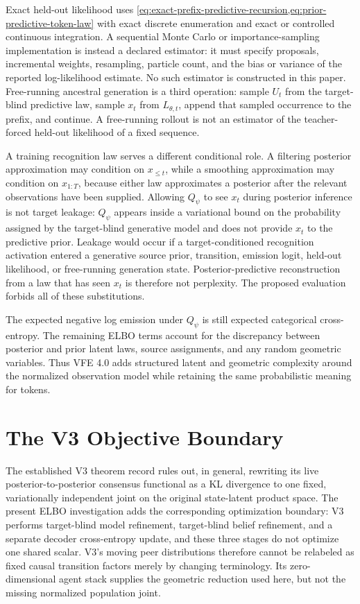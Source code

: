 Exact held-out likelihood uses \cref{eq:exact-prefix-predictive-recursion,eq:prior-predictive-token-law} with exact discrete enumeration and exact or controlled continuous integration. A sequential Monte Carlo or importance-sampling implementation is instead a declared estimator: it must specify proposals, incremental weights, resampling, particle count, and the bias or variance of the reported log-likelihood estimate. No such estimator is constructed in this paper. Free-running ancestral generation is a third operation: sample $U_t$ from the target-blind predictive law, sample $x_t$ from $L_{\theta,t}$, append that sampled occurrence to the prefix, and continue. A free-running rollout is not an estimator of the teacher-forced held-out likelihood of a fixed sequence.

A training recognition law serves a different conditional role. A filtering posterior approximation may condition on $x_{\leq t}$, while a smoothing approximation may condition on $x_{1:T}$, because either law approximates a posterior after the relevant observations have been supplied. Allowing $Q_\psi$ to see $x_t$ during posterior inference is not target leakage: $Q_\psi$ appears inside a variational bound on the probability assigned by the target-blind generative model and does not provide $x_t$ to the predictive prior. Leakage would occur if a target-conditioned recognition activation entered a generative source prior, transition, emission logit, held-out likelihood, or free-running generation state. Posterior-predictive reconstruction from a law that has seen $x_t$ is therefore not perplexity. The proposed evaluation forbids all of these substitutions.

The expected negative log emission under $Q_\psi$ is still expected categorical cross-entropy. The remaining ELBO terms account for the discrepancy between posterior and prior latent laws, source assignments, and any random geometric variables. Thus VFE 4.0 adds structured latent and geometric complexity around the normalized observation model while retaining the same probabilistic meaning for tokens.

\section{The V3 Objective Boundary}

The established V3 theorem record rules out, in general, rewriting its live posterior-to-posterior consensus functional as a KL divergence to one fixed, variationally independent joint on the original state-latent product space. The present ELBO investigation adds the corresponding optimization boundary: V3 performs target-blind model refinement, target-blind belief refinement, and a separate decoder cross-entropy update, and these three stages do not optimize one shared scalar. V3's moving peer distributions therefore cannot be relabeled as fixed causal transition factors merely by changing terminology. Its zero-dimensional agent stack supplies the geometric reduction used here, but not the missing normalized population joint.

